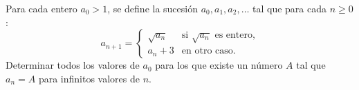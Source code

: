 Para cada entero $a_0 \gt 1$, se define la sucesión $a_0, a_1, a_2, \dots$ tal que para cada $n \ge 0$:
\[
a_{n+1} =
\begin{cases}
\sqrt{a_n} & \text{si } \sqrt{a_n} \text{ es entero,} \\
a_n + 3 & \text{en otro caso.}
\end{cases}
\]
Determinar todos los valores de $a_0$ para los que existe un número $A$ tal que $a_n = A$ para infinitos valores de $n$.